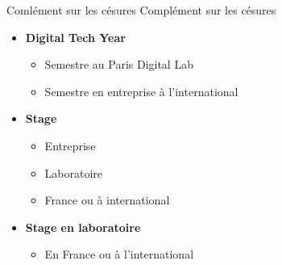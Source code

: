 \begin{frame}{Comlément sur les césures}
  Complément sur les césures
  \begin{itemize}
    \item \textbf{Digital Tech Year}
    \begin{itemize}
        \item Semestre au Paris Digital Lab
        \item Semestre en entreprise à l'international
    \end{itemize}
    \item \textbf{Stage}
    \begin{itemize}
        \item Entreprise
        \item Laboratoire
        \item France ou à international
    \end{itemize}
    \item \textbf{Stage en laboratoire}
    \begin{itemize}
        \item En France ou à l'international
    \end{itemize}
  \end{itemize}
\end{frame}

